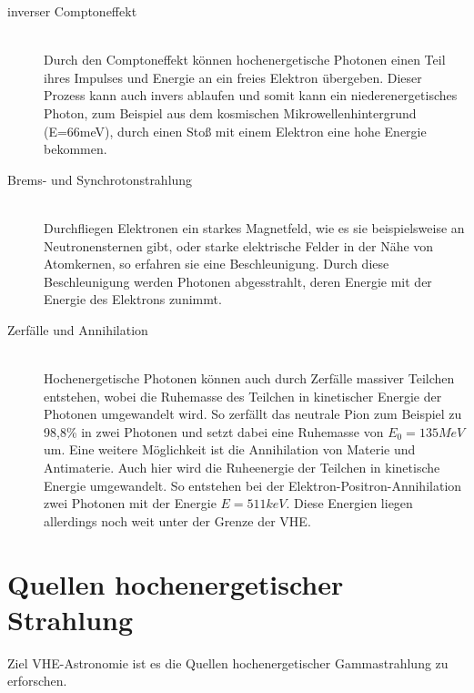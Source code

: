 \begin{description}
\item[inverser Comptoneffekt]\hfill \\
Durch den Comptoneffekt können hochenergetische Photonen einen Teil ihres Impulses und Energie an ein freies Elektron übergeben. Dieser Prozess kann auch invers ablaufen und somit kann ein niederenergetisches Photon, zum Beispiel aus dem kosmischen Mikrowellenhintergrund (E=66meV), durch einen Stoß mit einem Elektron eine hohe Energie bekommen.
\item[Brems- und Synchrotonstrahlung]\hfill \\
Durchfliegen Elektronen ein starkes Magnetfeld, wie es sie beispielsweise an Neutronensternen gibt, oder starke elektrische Felder in der Nähe von Atomkernen, so erfahren sie eine Beschleunigung. Durch diese Beschleunigung werden Photonen abgesstrahlt, deren Energie mit der Energie des Elektrons zunimmt.
\item[Zerfälle und Annihilation]\hfill \\ 
Hochenergetische Photonen können auch durch Zerfälle massiver Teilchen entstehen, wobei die Ruhemasse des Teilchen in kinetischer Energie der Photonen umgewandelt wird. So zerfällt das neutrale Pion zum Beispiel zu 98,8\% \cite{PDG} in zwei Photonen und setzt dabei eine Ruhemasse von $E_0=135MeV$ \cite{PDG} um. Eine weitere Möglichkeit ist die Annihilation von Materie und Antimaterie. Auch hier wird die Ruheenergie der Teilchen in kinetische Energie umgewandelt. So entstehen bei der Elektron-Positron-Annihilation zwei Photonen mit der Energie $E=511keV$.
Diese Energien liegen allerdings noch weit unter der Grenze der VHE.

\end{description}

\section{Quellen hochenergetischer Strahlung}
Ziel VHE-Astronomie ist es die Quellen hochenergetischer Gammastrahlung zu erforschen.

